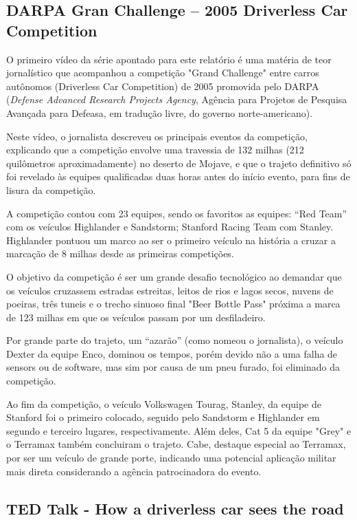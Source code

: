 \subsection{DARPA Gran Challenge -- 2005 Driverless Car Competition}

O primeiro vídeo da série apontado \cite{darpa2005} para este relatório é uma matéria de teor jornalístico que acompanhou a competição "Grand Challenge" entre carros autônomos (Driverless Car Competition) de 2005 promovida pelo DARPA (\textit{Defense Advanced Research Projects Agency}, Agência para Projetos de Pesquisa Avançada para Defeasa, em tradução livre, do governo norte-americano).

Neste vídeo, o jornalista descreveu os principais eventos da competição, explicando que a competição envolve uma travessia de 132 milhas (212 quilômetros aproximadamente) no deserto de Mojave, e que o trajeto definitivo só foi revelado às equipes qualificadas duas horas antes do início evento, para fins de lisura da competição.

A competição contou com 23 equipes, sendo os favoritos as equipes: ``Red Team'' com os veículos Highlander e Sandstorm; Stanford Racing Team com Stanley. Highlander pontuou um marco ao ser o primeiro veículo na história a cruzar a marcação de 8 milhas desde as primeiras competições.

O objetivo da competição é ser um grande desafio tecnológico ao demandar que os veículos cruzassem estradas estreitas, leitos de rios e lagos secos, nuvens de poeiras, três tuneis e o trecho sinuoso final "Beer Bottle Pass" próxima a marca de 123 milhas em que os veículos passam por um desfiladeiro.

Por grande parte do trajeto, um ``azarão'' (como nomeou o jornalista), o veículo Dexter da equipe Enco, dominou os tempos, porém devido não a uma falha de sensors ou de software, mas sim por causa de um pneu furado, foi eliminado da competição.

Ao fim da competição, o veículo Volkswagen Tourag, Stanley, da equipe de Stanford foi o primeiro colocado, seguido pelo Sandstorm e Highlander em segundo e terceiro lugares, respectivamente. Além deles, Cat 5 da equipe "Grey" e o Terramax também concluiram o trajeto. Cabe, destaque especial ao Terramax, por ser um veículo de grande porte, indicando uma potencial aplicação militar mais direta considerando a agência patrocinadora do evento.


\subsection{TED Talk - How a driverless car sees the road}

